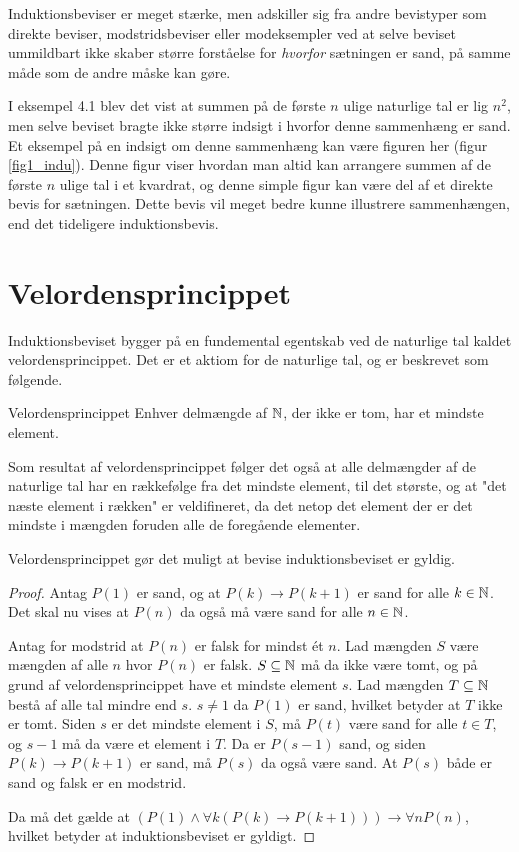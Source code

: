Induktionsbeviser er meget stærke, men adskiller sig fra andre bevistyper som direkte beviser, modstridsbeviser eller modeksempler ved at selve beviset ummildbart ikke skaber større forståelse for \textit{hvorfor} sætningen er sand, på samme måde som de andre måske kan gøre.

I eksempel 4.1 blev det vist at summen på de første $n$ ulige naturlige tal er lig $n^2$, men selve beviset bragte ikke større indsigt i hvorfor denne sammenhæng er sand.
Et eksempel på en indsigt om denne sammenhæng kan være figuren her (figur \ref{fig1_indu}).
Denne figur viser hvordan man altid kan arrangere summen af de første $n$ ulige tal i et kvardrat, og denne simple figur kan være del af et direkte bevis for sætningen.
Dette bevis vil meget bedre kunne illustrere sammenhængen, end det tideligere induktionsbevis.

\section{Velordensprincippet}
Induktionsbeviset bygger på en fundemental egentskab ved de naturlige tal kaldet velordensprincippet.
Det er et aktiom for de naturlige tal, og er beskrevet som følgende.
\begin{theorembox}{Velordensprincippet}
	Enhver delmængde af $\mathbb{N}$, der ikke er tom, har et mindste element.
\end{theorembox}
\noindent Som resultat af velordensprincippet følger det også at alle delmængder af de naturlige tal har en rækkefølge fra det mindste element, til det største, og at "det næste element i rækken" er veldifineret, da det netop det element der er det mindste i mængden foruden alle de foregående elementer.

Velordensprincippet gør det muligt at bevise induktionsbeviset er gyldig.
\begin{proof}
	Antag $P(1)$ er sand, og at $P(k) \to P(k + 1)$ er sand for alle $k \in \mathbb{N}$.
	Det skal nu vises at $P(n)$ da også må være sand for alle $n \in \mathbb{N}$.

	Antag for modstrid at $P(n)$ er falsk for mindst ét $n$.
	Lad mængden $S$ være mængden af alle $n$ hvor $P(n)$ er falsk.
	$S \subseteq \mathbb{N}$ må da ikke være tomt, og på grund af velordensprincippet have et mindste element $s$.
	Lad mængden $T \subseteq \mathbb{N}$ bestå af alle tal mindre end $s$. $s \neq 1$ da $P(1)$ er sand, hvilket betyder at $T$ ikke er tomt.
	Siden $s$ er det mindste element i $S$, må $P(t)$ være sand for alle $t \in T$, og $s - 1$ må da være et element i $T$.
	Da er $P(s-1)$ sand, og siden $P(k) \to P(k+1)$ er sand, må $P(s)$ da også være sand.
	At $P(s)$ både er sand og falsk er en modstrid.

	Da må det gælde at $(P(1) \land \forall k ( P(k) \to P(k + 1))) \to \forall n P(n)$, hvilket betyder at induktionsbeviset er gyldigt.
\end{proof}

